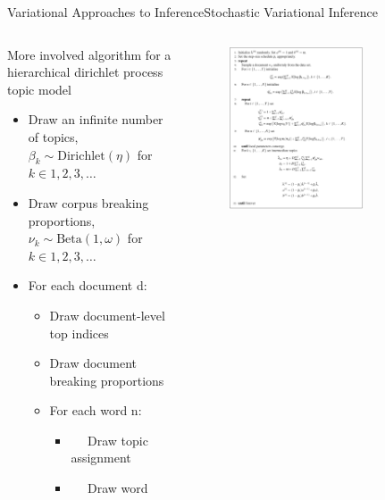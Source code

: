 \documentclass[AERbeamer%
              ,optEnglish%
              ,optBiber%
              ,optBibstyleAlphabetic%
              ,optBeamerClassicFormat%
              ]{AERlatex}%
\begin{document}
\begin{frame}[c]{Variational Approaches to Inference}{Stochastic Variational Inference}
    \centering
    \begin{columns}[T]
        \begin{column}{0.4\textwidth}
                More involved algorithm for a hierarchical dirichlet process topic model
                \begin{itemize}
                    \item Draw an infinite number of topics, $\beta_{k} \sim \text{Dirichlet}(\eta)$ for $k \in {1, 2, 3, \ldots}$
                    \item Draw corpus breaking proportions, $\nu_{k} \sim \text{Beta}(1, \omega)$ for $k \in {1, 2, 3, \ldots}$
                    \item For each document d:
                    \begin{itemize}
                        \item Draw document-level top indices
                        \item Draw document breaking proportions
                        \item For each word n:
                        \begin{itemize}
                            \item $\quad$ Draw topic assignment
                            \item $\quad$ Draw word
                        \end{itemize}
                    \end{itemize}
                \end{itemize}
        \end{column}
        \begin{column}{0.58\textwidth}
            \begin{figure}
                \centering
                \includegraphics[width=0.7\textwidth]{VISVIforHDP.png}
            \end{figure}
        \end{column}
    \end{columns}
\end{frame}
\end{document}
